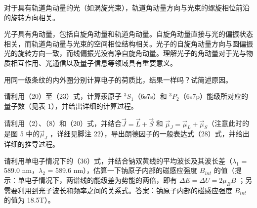 \documentclass[dvipsnames, svgnames,a4paper,11pt]{article}
\begin{document}
	对于具有轨道角动量的光（如涡旋光束），轨道角动量方向与光束的螺旋相位前沿的旋转方向相关。


	光子具有角动量，包括自旋角动量和轨道角动量。自旋角动量直接与光的偏振状态相关，而轨道角动量与光束的空间相位结构相关。光子的自旋角动量方向与圆偏振光的旋转方向一致，而线偏振光没有净自旋角动量。理解光子的角动量对于光与物质相互作用、光通信以及量子信息等领域具有重要意义。





\begin{question}
	用同一级条纹的内外圈分别计算电子的荷质比，结果一样吗？试简述原因。
\end{question}







\begin{question}
	请利用（20）至（23）式，计算汞原子 $^3S_1$（6s7s）和 $^3P_2$（6s7p）能级所对应的量子数（见表 1），并给出详细的计算过程。
\end{question}

		


\begin{question}
	请利用（2）、（8）和（20）式，并结合$\vec{J} = \vec{L} + \vec{S}$ 和 $\vec{\mu}_J = \vec{\mu}_L + \vec{\mu}_S $（注意此时的是图 5 中的$\vec{\mu}_J$ ，详细见脚注 22），导出朗德因子的一般表达式（28）式，并给出详细的推导过程。
\end{question}

	

\begin{question}
	请利用单电子情况下的（36）式，并结合钠双黄线的平均波长及其波长差（$\lambda_1$ = 589.0 nm，$\lambda_2$  = 589.6 nm），估算一下钠原子内部的磁感应强度 $B_{int}$ 的值（提示：单电子情况下，两谱线的能级差为势能的两倍，即有 $\Delta E = \Delta U =2 \mu_B B$ ；另需要利用到光子波长和频率之间的关系式。答案：钠原子内部的磁感应强度 $B_{int}$ 的值为 18.5T）。
\end{question}
\end{document}

